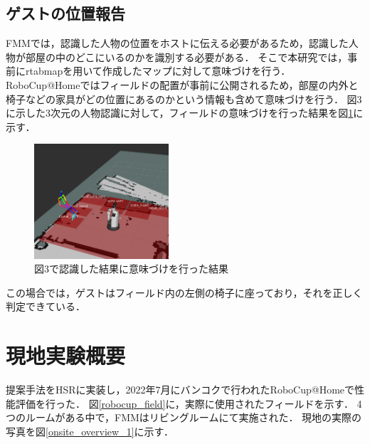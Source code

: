 \documentclass[a4j]{jarticle}
\begin{document}
\subsection{ゲストの位置報告}
FMMでは，認識した人物の位置をホストに伝える必要があるため，認識した人物が部屋の中のどこにいるのかを識別する必要がある．
そこで本研究では，事前にrtabmap\cite{rtabmap}を用いて作成したマップに対して意味づけを行う．
RoboCup@Homeではフィールドの配置が事前に公開されるため，部屋の内外と椅子などの家具がどの位置にあるのかという情報も含めて意味づけを行う．
図3に示した3次元の人物認識に対して，フィールドの意味づけを行った結果を図\ref{human_where_map}に示す．
\begin{figure}[t]
  \centering
  \includegraphics[width=5cm]{images/human_recognition/ss_5_trim.png}
  \caption{図3で認識した結果に意味づけを行った結果}
  \label{human_where_map}
\end{figure}
この場合では，ゲストはフィールド内の左側の椅子に座っており，それを正しく判定できている．


\section{現地実験概要}
提案手法をHSRに実装し，2022年7月にバンコクで行われたRoboCup@Homeで性能評価を行った．
図\ref{robocup_field}に，実際に使用されたフィールドを示す．
4つのルームがある中で，FMMはリビングルームにて実施された．
現地の実際の写真を図\ref{onsite_overview_1}に示す．
\end{document}
